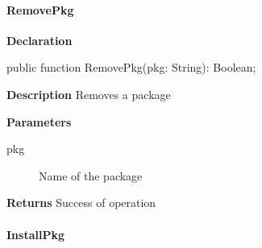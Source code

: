 \documentclass{report}
\newif\ifpdf
\begin{document}
\paragraph*{RemovePkg}\hspace*{\fill}

\label{packagekit.TPackageKit-RemovePkg}
\begin{list}{}{
\setlength{\itemindent}{0cm}
\setlength{\listparindent}{0cm}
\setlength{\leftmargin}{\evensidemargin}
\addtolength{\leftmargin}{\tmplength}
\settowidth{\labelsep}{X}
\addtolength{\leftmargin}{\labelsep}
\setlength{\labelwidth}{\tmplength}
}
\item[\textbf{Declaration}\hfill]
\ifpdf
\begin{flushleft}
\fi
\begin{ttfamily}
public function RemovePkg(pkg: String): Boolean;\end{ttfamily}

\ifpdf
\end{flushleft}
\fi

\par
\item[\textbf{Description}]
Removes a package  \par
\item[\textbf{Parameters}]
\begin{description}
\item[pkg] Name of the package
\end{description}
\item[\textbf{Returns}]Success of operation


\end{list}
\paragraph*{InstallPkg}\hspace*{\fill}
\end{document}
